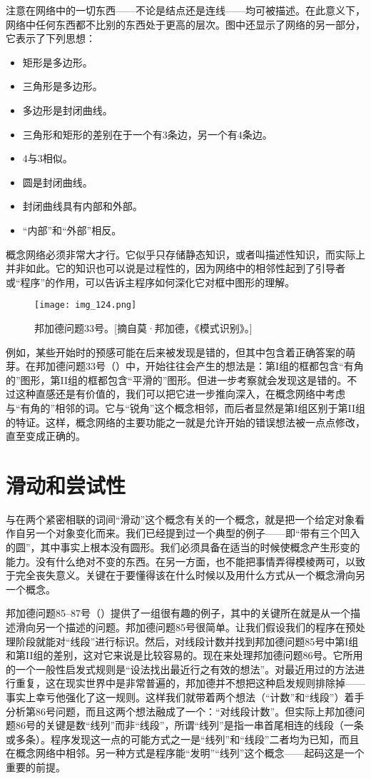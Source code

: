 注意在网络中的一切东西——不论是结点还是连线——均可被描述。在此意义下，网络中任何东西都不比别的东西处于更高的层次。图中还显示了网络的另一部分，它表示了下列思想：
\begin{itemize}
\item 矩形是多边形。
\item 三角形是多边形。
\item 多边形是封闭曲线。
\item 三角形和矩形的差别在于一个有$3$条边，另一个有$4$条边。
\item $4$与$3$相似。
\item 圆是封闭曲线。
\item 封闭曲线具有内部和外部。
\item “内部”和“外部”相反。
\end{itemize}

概念网络必须非常大才行。它似乎只存储静态知识，或者叫描述性知识，而实际上并非如此。它的知识也可以说是过程性的，因为网络中的相邻性起到了引导者或“程序”的作用，可以告诉主程序如何深化它对框中图形的理解。

\begin{figure}
\texttt{[image: img\_124.png]}
\caption[邦加德问题33号。]
  {邦加德问题33号。[摘自莫·邦加德，《模式识别》。]}
\end{figure}

例如，某些开始时的预感可能在后来被发现是错的，但其中包含着正确答案的萌芽。在邦加德问题33号（）中，开始往往会产生的想法是：第I组的框都包含“有角的”图形，第II组的框都包含“平滑的”图形。但进一步考察就会发现这是错的。不过这种直感还是有价值的，我们可以把它进一步推向深入，在概念网络中考虑与“有角的”相邻的词。它与“锐角”这个概念相邻，而后者显然是第I组区别于第II组的特证。这样，概念网络的主要功能之一就是允许开始的错误想法被一点点修改，直至变成正确的。

\section{滑动和尝试性}

与在两个紧密相联的词间“滑动”这个概念有关的一个概念，就是把一个给定对象看作自另一个对象变化而来。我们已经提到过一个典型的例子——即“带有三个凹入的圆”，其中事实上根本没有圆形。我们必须具备在适当的时候使概念产生形变的能力。没有什么绝对不变的东西。在另一方面，也不能把事情弄得模棱两可，以致于完全丧失意义。关键在于要懂得该在什么时候以及用什么方式从一个概念滑向另一个概念。

邦加德问题85--87号（）提供了一组很有趣的例子，其中的关键所在就是从一个描述滑向另一个描述的问题。邦加德问题85号很简单。让我们假设我们的程序在预处理阶段就能对“线段”进行标识。然后，对线段计数并找到邦加德问题85号中第I组和第II组的差别，这对它来说是比较容易的。现在来处理邦加德问题86号。它所用的一个一般性启发式规则是“设法找出最近行之有效的想法”。对最近用过的方法进行重复，这在现实世界中是非常普遍的，邦加德并不想把这种启发规则排除掉——事实上幸亏他强化了这一规则。这样我们就带着两个想法（“计数”和“线段”）着手分析第86号问题，而且这两个想法融成了一个：“对线段计数”。但实际上邦加德问题86号的关键是数“线列”而非“线段”，所谓“线列”是指一串首尾相连的线段（一条或多条）。程序发现这一点的可能方式之一是“线列”和“线段”二者均为已知，而且在概念网络中相邻。另一种方式是程序能“发明”“线列”这个概念——起码这是一个重要的前提。

